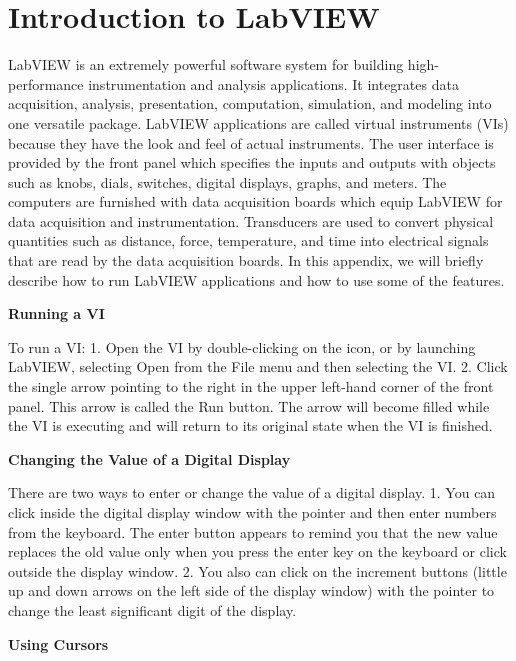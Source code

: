 
\section{Introduction to LabVIEW}

LabVIEW is an extremely powerful software system for building high-performance
instrumentation and analysis applications. It integrates data acquisition,
analysis, presentation, computation, simulation, and modeling into
one versatile package. LabVIEW applications are called virtual instruments
(VIs) because they have the look and feel of actual instruments. The
user interface is provided by the front panel which specifies the
inputs and outputs with objects such as knobs, dials, switches, digital
displays, graphs, and meters. The computers are furnished with data
acquisition boards which equip LabVIEW for data acquisition and instrumentation.
Transducers are used to convert physical quantities such as distance,
force, temperature, and time into electrical signals that are read
by the data acquisition boards. In this appendix, we will briefly
describe how to run LabVIEW applications and how to use some of the
features.

\textbf{Running a VI} 

To run a VI: 1. Open the VI by double-clicking on the icon, or by
launching LabVIEW, selecting Open from the File menu and then selecting
the VI. 2. Click the single arrow pointing to the right in the upper
left-hand corner of the front panel. This arrow is called the Run
button. The arrow will become filled while the VI is executing and
will return to its original state when the VI is finished.

\textbf{Changing the Value of a Digital Display }

There are two ways to enter or change the value of a digital display.
1. You can click inside the digital display window with the pointer
and then enter numbers from the keyboard. The enter button appears
to remind you that the new value replaces the old value only when
you press the enter key on the keyboard or click outside the display
window. 2. You also can click on the increment buttons (little up
and down arrows on the left side of the display window) with the pointer
to change the least significant digit of the display.

\textbf{Using Cursors} 

